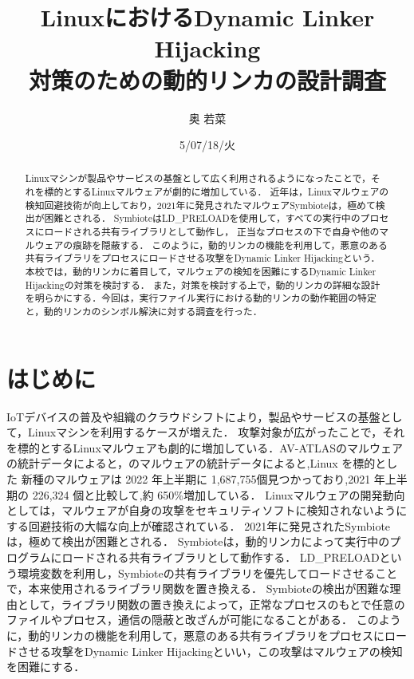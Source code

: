 \documentclass[submit,techreq,noauthor,dvipdfmx]{mid-eco}
\begin{document}
\date   {5/07/18/火}				%
\title  {LinuxにおけるDynamic Linker Hijacking\\対策のための動的リンカの設計調査}	%
\author {奥 若菜}				%


\begin{abstract}
	Linuxマシンが製品やサービスの基盤として広く利用されるようになったことで，それを標的とするLinuxマルウェアが劇的に増加している．
  近年は，Linuxマルウェアの検知回避技術が向上しており，2021年に発見されたマルウェアSymbioteは，極めて検出が困難とされる．
  SymbioteはLD\_PRELOADを使用して，すべての実行中のプロセスにロードされる共有ライブラリとして動作し，
  正当なプロセスの下で自身や他のマルウェアの痕跡を隠蔽する．
  このように，動的リンカの機能を利用して，悪意のある共有ライブラリをプロセスにロードさせる攻撃をDynamic Linker Hijackingという．
  本校では，動的リンカに着目して，マルウェアの検知を困難にするDynamic Linker Hijackingの対策を検討する．
  また，対策を検討する上で，動的リンカの詳細な設計を明らかにする．今回は，実行ファイル実行における動的リンカの動作範囲の特定と，動的リンカのシンボル解決に対する調査を行った．
\end{abstract}
\maketitle


\section{はじめに}
IoTデバイスの普及や組織のクラウドシフトにより，製品やサービスの基盤として，Linuxマシンを利用するケースが増えた．
攻撃対象が広がったことで，それを標的とするLinuxマルウェアも劇的に増加している．AV-ATLASのマルウェアの統計データによると，のマルウェアの統計データによると,Linux を標的とした
新種のマルウェアは 2022 年上半期に 1,687,755個見つかっており,2021 年上半期の 226,324 個と比較して,約 650\%増加している\cite{AV-TEST}．
Linuxマルウェアの開発動向としては，マルウェアが自身の攻撃をセキュリティソフトに検知されないようにする回避技術の大幅な向上が確認されている\cite{IBM}．
2021年に発見されたSymbioteは，極めて検出が困難とされる\cite{Symbiote}．
Symbioteは，動的リンカによって実行中のプログラムにロードされる共有ライブラリとして動作する．
LD\_PRELOADという環境変数を利用し，Symbioteの共有ライブラリを優先してロードさせることで，本来使用されるライブラリ関数を置き換える．
Symbioteの検出が困難な理由として，ライブラリ関数の置き換えによって，正常なプロセスのもとで任意のファイルやプロセス，通信の隠蔽と改ざんが可能になることがある．
このように，動的リンカの機能を利用して，悪意のある共有ライブラリをプロセスにロードさせる攻撃をDynamic Linker Hijackingといい，この攻撃はマルウェアの検知を困難にする．
\end{document}
